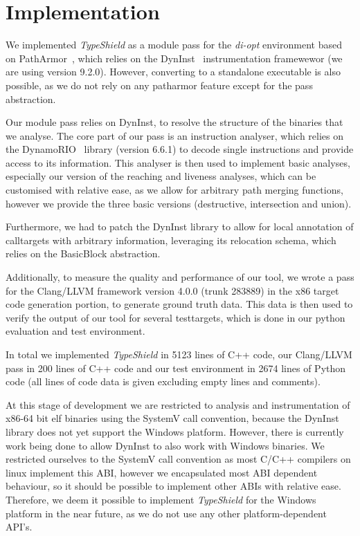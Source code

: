 \section{Implementation}
\label{chapter:Implementation}

We implemented \textit{TypeShield} as a module pass for the \textit{di-opt} environment based on PathArmor~\cite{veen:cfi}, 
which relies on the DynInst~\cite{bernat:dyninst} instrumentation framewewor (we are using version 9.2.0). 
However, converting to a standalone executable is also possible, as we do not rely on any patharmor feature
except for the pass abstraction.

Our module pass relies on DynInst, to resolve the structure of the binaries that we analyse. The core part 
of our pass is an instruction analyser, which relies on the DynamoRIO~\cite{dynamorio:drmemory} library 
(version 6.6.1) to decode single instructions and provide access to its information. This analyser is then
used to implement basic analyses, especially our version of the reaching and liveness analyses, which can
be customised with relative ease, as we allow for arbitrary path merging functions, however we provide 
the three basic versions (destructive, intersection and union).

Furthermore, we had to patch the DynInst library to allow for local annotation of calltargets with arbitrary
information, leveraging its relocation schema, which relies on the BasicBlock abstraction.

Additionally, to measure the quality and performance of our tool, we wrote a pass for the Clang/LLVM framework
version 4.0.0 (trunk 283889) in the x86 target code generation portion, to generate ground truth data. This
data is then used to verify the output of our tool for several testtargets, which is done in our python 
evaluation and test environment.

In total we implemented \textit{TypeShield} in 5123 lines of C++ code, our Clang/LLVM pass in 200 lines 
of C++ code and our test environment in 2674 lines of Python code (all lines of code data is given 
excluding empty lines and comments).

At this stage of development we are restricted to analysis and instrumentation of x86-64 bit elf 
binaries using the SystemV call convention, because the DynInst library does not yet support the
Windows platform. However, there is currently work being done to allow DynInst to also work with
Windows binaries. We restricted ourselves to the SystemV call convention as most C/C++ compilers
on linux implement this ABI, however we encapsulated most ABI dependent behaviour, so it should 
be possible to implement other ABIs with relative ease. Therefore, we deem it possible to implement
\textit{TypeShield} for the Windows platform in the near future, as we do not use any other 
platform-dependent API's. 

